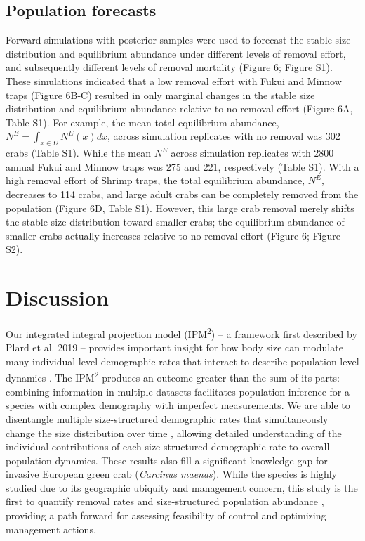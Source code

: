 \documentclass{article}
\begin{document}
\subsection{Population forecasts}

Forward simulations with posterior samples were used to forecast the stable size distribution and equilibrium abundance under different levels of removal effort, and subsequently different levels of removal mortality (Figure 6; Figure S1). These simulations indicated that a low removal effort with Fukui and Minnow traps (Figure 6B-C) resulted in only marginal changes in the stable size distribution and equilibrium abundance relative to no removal effort (Figure 6A, Table S1). For example, the mean total equilibrium abundance, $N^{E} = \int_{x \in \Omega}N^E(x)dx$, across simulation replicates with no removal was 302 crabs (Table S1). While the mean $N^{E}$ across simulation replicates with 2800 annual Fukui and Minnow traps was 275 and 221, respectively (Table S1). With a high removal effort of Shrimp traps, the total equilibrium abundance, $N^{E}$, decreases to 114 crabs, and large adult crabs can be completely removed from the population (Figure 6D, Table S1). However, this large crab removal merely shifts the stable size distribution toward smaller crabs; the equilibrium abundance of smaller crabs actually increases relative to no removal effort (Figure 6; Figure S2).

\section{Discussion}

Our integrated integral projection model (IPM\textsuperscript{2}) – a framework first described by Plard et al. 2019 – provides important insight for how body size can modulate many individual-level demographic rates that interact to describe population-level dynamics \parencite{plard2019ipm}. The IPM\textsuperscript{2} produces an outcome greater than the sum of its parts: combining information in multiple datasets facilitates population inference for a species with complex demography with imperfect measurements. We are able to disentangle multiple size-structured demographic rates that simultaneously change the size distribution over time \parencite{sogard1997size, carlson2010bayesian}, allowing detailed understanding of the individual contributions of each size-structured demographic rate to overall population dynamics. These results also fill a significant knowledge gap for invasive European green crab (\textit{Carcinus maenas}). While the species is highly studied due to its geographic ubiquity and management concern, this study is the first to quantify removal rates and size-structured population abundance \parencite{young2019life}, providing a path forward for assessing feasibility of control and optimizing management actions.
\end{document}
